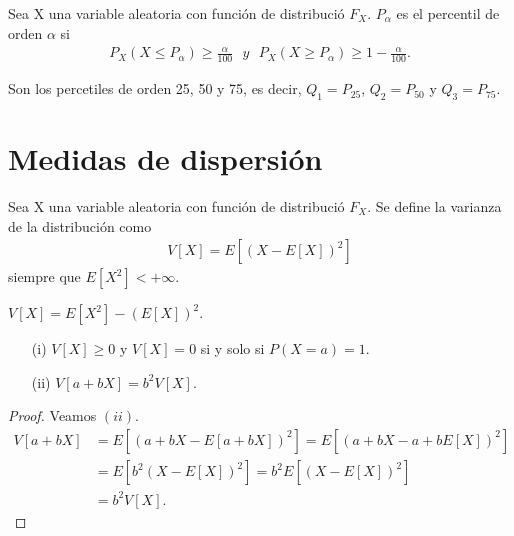 \begin{defi}[Percentiles]
    Sea X una variable aleatoria con función de distribució $F_X$. $P_{\alpha}$ es el percentil de orden $\alpha$ si
    \begin{align*}
        P_X(X \leq P_{\alpha}) \ge \frac{\alpha}{100} \ \ \ y \ \ \ P_X(X \ge P_{\alpha}) \ge 1 - \frac{\alpha}{100}.
    \end{align*}
\end{defi}

\begin{defi}[Cuartiles]
    Son los percetiles de orden 25, 50 y 75, es decir, $Q_1 = P_{25}$, $Q_2 = P_{50}$ y $Q_3 = P_{75}$.
\end{defi}

\section{Medidas de dispersión}

\begin{defi}[Varianza]
    Sea X una variable aleatoria con función de distribució $F_X$. Se define la varianza de la distribución como
    \begin{align*}
        V[X] = E[(X - E[X])^2]
    \end{align*}
    siempre que $E[X^2] < +\infty$.
\end{defi}

\begin{obs}
    $V[X] = E[X^2] - (E[X])^2$.
\end{obs}

\begin{prop}
    \begin{enumerate}
        \item[(i)] $V[X] \ge 0$ y $V[X] = 0$ si y solo si $P(X = a) = 1$.
        \item[(ii)] $V[a + bX] = b^2V[X]$.
    \end{enumerate}
\end{prop}

\begin{proof}
    Veamos $(ii)$.
    \begin{align*}
        V[a + bX] & = E[(a + bX - E[a + bX])^2] = E[(a + bX - a + bE[X])^2] \\
                  & = E[b^2(X - E[X])^2] = b^2E[(X - E[X])^2]               \\
                  & = b^2V[X].
    \end{align*}
\end{proof}

